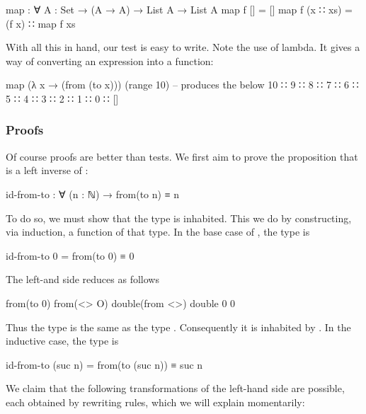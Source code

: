 \begin{colored}[elm]
map : ∀ {A : Set} → (A → A) → List A → List A
map f [] = []
map f (x ∷ xs) = (f x) ∷ map f xs
\end{colored}

With all this in hand, our test is easy to write.  Note the use of lambda.  It gives a way of converting an expression into a function:

\begin{colored}[elm]
map (λ x → (from (to x))) (range 10)
-- produces the below
10 ∷ 9 ∷ 8 ∷ 7 ∷ 6 ∷ 5 ∷ 4 ∷ 3 ∷ 2 ∷ 1 ∷ 0 ∷ []
\end{colored}

\subsubsection{Proofs}

Of course proofs are better than tests.  We first aim to prove the proposition that  is a left inverse of :

\begin{colored}[elm]
id-from-to : ∀ (n : ℕ) → from(to n) ≡ n
\end{colored}

To do so, we must show that the type  is inhabited.  This we do by constructing, via induction, a function of that type.  In the base case of , the type is

\begin{colored}[elm]
id-from-to 0 = from(to 0) ≡ 0
\end{colored}

The left-and side reduces as follows

\begin{colored}[elm]
from(to 0)
from(<> O)
double(from <>)
double 0
0
\end{colored}

Thus the type  is the same as the type .  Consequently it is inhabited by . In the inductive case, the type is

\begin{colored}[elm]
id-from-to (suc n) = from(to (suc n)) ≡ suc n
\end{colored}

We claim that the following transformations of the left-hand side are possible, each obtained by rewriting rules, which we will explain momentarily:


